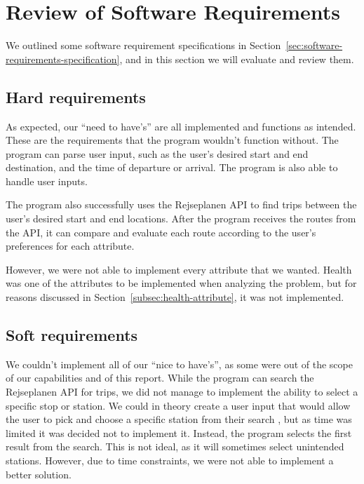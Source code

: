 \section{Review of Software Requirements}\label{sec:review-of-software-requirements}

We outlined some software requirement specifications in Section~\ref{sec:software-requirements-specification},
and in this section we will evaluate and review them.

\subsection{Hard requirements}\label{subsec:functional-requirements}

As expected, our ``need to have's'' are all implemented and functions as intended.
These are the requirements that the program wouldn't function without.
The program can parse user input, such as the user's desired start and end destination, and the time of departure or
arrival.
The program is also able to handle user inputs.

The program also successfully uses the Rejseplanen API to find trips between the user's desired start and end locations.
After the program receives the routes from the API, it can compare and evaluate each route according to the user's
preferences for each attribute.

However, we were not able to implement every attribute that we wanted.
Health was one of the attributes to be implemented when analyzing the problem, but for reasons discussed in
Section~\ref{subsec:health-attribute}, it was not implemented.

\subsection{Soft requirements}\label{subsec:non-functional-requirements}

We couldn't implement all of our ``nice to have's'', as some were out of the scope of our capabilities and of this
report.
While the program can search the Rejseplanen API for trips, we did not manage to implement the ability to select a
specific stop or station.
We could in theory create a user input that would allow the user to pick and choose a specific station from their search
, but as time was limited it was decided not to implement it.
Instead, the program selects the first result from the search.
This is not ideal, as it will sometimes select unintended stations.
However, due to time constraints, we were not able to implement a better solution.

